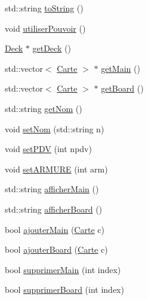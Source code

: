 \begin{DoxyCompactItemize}
\item 
std\-::string \hyperlink{class_joueur_a99e2e0934bb9307f577d9fa3f219a7b6}{to\-String} ()
\item 
void \hyperlink{class_joueur_a91239ad650edadbee5b1b51d19242d28}{utiliser\-Pouvoir} ()
\item 
\hyperlink{class_deck}{Deck} $\ast$ \hyperlink{class_joueur_a5f7a140f00766144edf7d6a5b0f236b7}{get\-Deck} ()
\item 
std\-::vector$<$ \hyperlink{class_carte}{Carte} $>$ $\ast$ \hyperlink{class_joueur_a569fa77a585a0e82981bfa6bda149a4f}{get\-Main} ()
\item 
std\-::vector$<$ \hyperlink{class_carte}{Carte} $>$ $\ast$ \hyperlink{class_joueur_abe6504e86cf56787e5569c296e3bfde7}{get\-Board} ()
\item 
std\-::string \hyperlink{class_joueur_a5ba8036208a35efd6bf37a86b36063b0}{get\-Nom} ()
\item 
void \hyperlink{class_joueur_afa24ba80453522ff059e7e6f46653749}{set\-Nom} (std\-::string n)
\item 
void \hyperlink{class_joueur_ac4b9408bed0a64ac63188f7f8e1a73d9}{set\-P\-D\-V} (int npdv)
\item 
void \hyperlink{class_joueur_a2ff017f6e65cad383d00d153ece08045}{set\-A\-R\-M\-U\-R\-E} (int arm)
\item 
std\-::string \hyperlink{class_joueur_a4a41ec6aaa2e7b4a55807b86cc286876}{afficher\-Main} ()
\item 
std\-::string \hyperlink{class_joueur_aae890e668b097dddee94a61404553c8f}{afficher\-Board} ()
\item 
bool \hyperlink{class_joueur_a0b94001f3dd61af944bd7128d143ac11}{ajouter\-Main} (\hyperlink{class_carte}{Carte} c)
\item 
bool \hyperlink{class_joueur_a5046cd3251b93c58558ca273db1aa23b}{ajouter\-Board} (\hyperlink{class_carte}{Carte} c)
\item 
bool \hyperlink{class_joueur_ae1c641d98c6e9fda547c3b7e923f085e}{supprimer\-Main} (int index)
\item 
bool \hyperlink{class_joueur_af086855b254a628bc9c07047142fb33c}{supprimer\-Board} (int index)
\end{DoxyCompactItemize}


